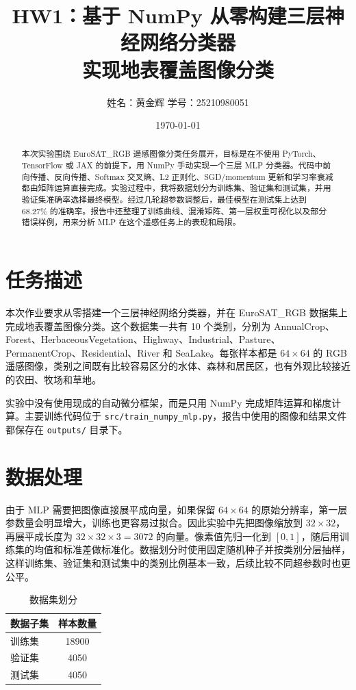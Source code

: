 \documentclass[UTF8,a4paper,11pt,fontset=none]{ctexart}
\title{HW1：基于 NumPy 从零构建三层神经网络分类器\\实现地表覆盖图像分类}
\author{姓名：黄金辉 \quad 学号：25210980051}
\date{\today}
\begin{document}
\maketitle

\begin{abstract}
本次实验围绕 EuroSAT\_RGB 遥感图像分类任务展开，目标是在不使用 PyTorch、TensorFlow 或 JAX 的前提下，用 NumPy 手动实现一个三层 MLP 分类器。代码中前向传播、反向传播、Softmax 交叉熵、L2 正则化、SGD/momentum 更新和学习率衰减都由矩阵运算直接完成。实验过程中，我将数据划分为训练集、验证集和测试集，并用验证集准确率选择最终模型。经过几轮超参数调整后，最佳模型在测试集上达到 68.27\% 的准确率。报告中还整理了训练曲线、混淆矩阵、第一层权重可视化以及部分错误样例，用来分析 MLP 在这个遥感任务上的表现和局限。
\end{abstract}

\section{任务描述}

本次作业要求从零搭建一个三层神经网络分类器，并在 EuroSAT\_RGB 数据集上完成地表覆盖图像分类。这个数据集一共有 10 个类别，分别为 AnnualCrop、Forest、HerbaceousVegetation、Highway、Industrial、Pasture、PermanentCrop、Residential、River 和 SeaLake。每张样本都是 $64\times64$ 的 RGB 遥感图像，类别之间既有比较容易区分的水体、森林和居民区，也有外观比较接近的农田、牧场和草地。

实验中没有使用现成的自动微分框架，而是只用 NumPy 完成矩阵运算和梯度计算。主要训练代码位于 \texttt{src/train\_numpy\_mlp.py}，报告中使用的图像和结果文件都保存在 \texttt{outputs/} 目录下。

\section{数据处理}

由于 MLP 需要把图像直接展平成向量，如果保留 $64\times64$ 的原始分辨率，第一层参数量会明显增大，训练也更容易过拟合。因此实验中先把图像缩放到 $32\times32$，再展平成长度为 $32\times32\times3=3072$ 的向量。像素值先归一化到 $[0,1]$，随后用训练集的均值和标准差做标准化。数据划分时使用固定随机种子并按类别分层抽样，这样训练集、验证集和测试集中的类别比例基本一致，后续比较不同超参数时也更公平。

\begin{table}[H]
  \centering
  \caption{数据集划分}
  \begin{tabular}{lc}
    \toprule
    数据子集 & 样本数量 \\
    \midrule
    训练集 & 18900 \\
    验证集 & 4050 \\
    测试集 & 4050 \\
    \bottomrule
  \end{tabular}
\end{table}
\end{document}
